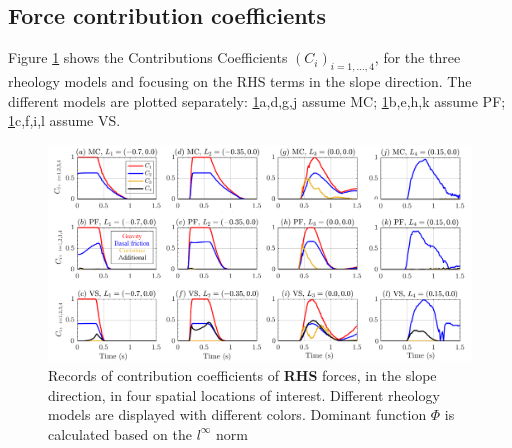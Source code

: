 \documentclass{article}
\begin{document}
\subsection{Force contribution coefficients}
Figure \ref{fig:Ramp-Ci_x} shows the Contributions Coefficients $(C_i)_{i=1,\dots,4}$, for the three rheology models and focusing on the RHS terms in the slope direction. The different models are plotted separately: \ref{fig:Ramp-Ci_x}a,d,g,j assume MC; \ref{fig:Ramp-Ci_x}b,e,h,k assume PF; \ref{fig:Ramp-Ci_x}c,f,i,l assume VS.
\begin{figure}[H]
         \centering
        \includegraphics[width=1\textwidth]{InclinedPlane/ForceContrib/Ci_x.png}
        \caption{Records of contribution coefficients of \textbf{RHS} forces, in the slope direction, in four spatial locations of interest. Different rheology models are displayed with different colors. Dominant function $\Phi$ is calculated based on the $l^\infty$ norm}
        \label{fig:Ramp-Ci_x}
\end{figure}
\end{document}
